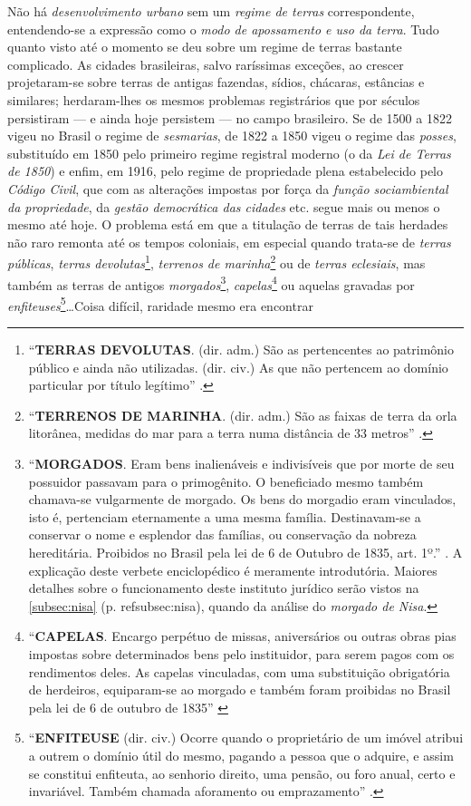 Não há \textit{desenvolvimento urbano} sem um \textit{regime de terras} correspondente, entendendo-se a expressão como o \textit{modo de apossamento e uso da terra}. Tudo quanto visto até o momento se deu sobre um regime de terras bastante complicado. As cidades brasileiras, salvo raríssimas exceções, ao crescer projetaram-se sobre terras de antigas fazendas, sídios, chácaras, estâncias e similares; herdaram-lhes os mesmos problemas registrários que por séculos persistiram --- e ainda hoje persistem --- no campo brasileiro. Se de 1500 a 1822 vigeu no Brasil o regime de \textit{sesmarias}, de 1822 a 1850 vigeu o regime das \textit{posses}, substituído em 1850 pelo primeiro regime registral moderno (o da \textit{Lei de Terras de 1850}) e enfim, em 1916, pelo regime de propriedade plena estabelecido pelo \textit{Código Civil}, que com as alterações impostas por força da \textit{função sociambiental da propriedade}, da \textit{gestão democrática das cidades} etc. segue mais ou menos o mesmo até hoje. O problema está em que a titulação de terras de tais herdades não raro remonta até os tempos coloniais, em especial quando trata-se de \textit{terras públicas}, \textit{terras devolutas}\footnote{``\textbf{TERRAS DEVOLUTAS}. (dir. adm.) São as pertencentes ao patrimônio público e ainda não utilizadas. (dir. civ.) As que não pertencem ao domínio particular por título legítimo'' \cite[p.~349]{soibelman_enciclo_1979}.}, \textit{terrenos de marinha}\footnote{``\textbf{TERRENOS DE MARINHA}. (dir. adm.) São as faixas de terra da orla litorânea, medidas do mar para a terra numa distância de 33 metros'' \cite[p.~349]{soibelman_enciclo_1979}.} ou de \textit{terras eclesiais}, mas também as terras de antigos \textit{morgados}\footnote{``\textbf{MORGADOS}. Eram bens inalienáveis e indivisíveis que por morte de seu possuidor passavam para o primogênito. O beneficiado mesmo também chamava-se vulgarmente de morgado. Os bens do morgadio eram vinculados, isto é, pertenciam eternamente a uma mesma família. Destinavam-se a conservar o nome e esplendor das famílias, ou conservação da nobreza hereditária. Proibidos no Brasil pela lei de 6 de Outubro de 1835, art. 1º.'' \cite[p.~242]{soibelman_enciclo_1979}. A explicação deste verbete enciclopédico é meramente introdutória. Maiores detalhes sobre o funcionamento deste instituto jurídico serão vistos na \autoref{subsec:nisa} (p. \pageref{sec:insbrascontint}ref{subsec:nisa}), quando da análise do \textit{morgado de Nisa}.}, \textit{capelas}\footnote{``\textbf{CAPELAS}. Encargo perpétuo de missas, aniversários ou outras obras pias impostas sobre determinados bens pelo instituidor, para serem pagos com os rendimentos deles. As capelas vinculadas, com uma substituição obrigatória de herdeiros, equiparam-se ao morgado e também foram proibidas no Brasil pela lei de 6 de outubro de 1835'' \cite[p.~57]{soibelman_enciclo_1979}} ou aquelas gravadas por \textit{enfiteuses}\footnote{``\textbf{ENFITEUSE} (dir. civ.) Ocorre quando o proprietário de um imóvel atribui a outrem o domínio útil do mesmo, pagando a pessoa que o adquire, e assim se constitui enfiteuta, ao senhorio direito, uma pensão, ou foro anual, certo e invariável. Também chamada aforamento ou emprazamento'' \cite[p.~146]{soibelman_enciclo_1979}.}\dots Coisa difícil, raridade mesmo era encontrar 